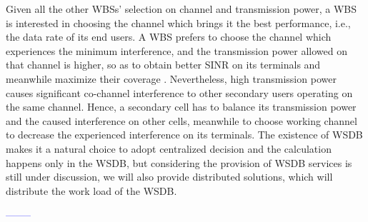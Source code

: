 \documentclass[times]{ettauth}
\newcommand{\ie}{i.e., }
\theoremstyle{mytheoremstyle}
\theoremstyle{mytheoremstyle}
\theoremstyle{mytheoremstyle}
\begin{document}
Given all the other WBSs' selection on channel and transmission power, a WBS is interested in choosing the channel which brings it the best performance, \ie the data rate of its end users.
A WBS prefers to choose the channel which experiences the minimum interference, and the transmission power allowed on that channel is higher, so as to obtain better SINR on its terminals and meanwhile maximize their coverage \cite{wuinfocom09, HoangPowerChannel2010}. 
Nevertheless, high transmission power causes significant co-channel interference to other secondary users operating on the same channel. 
Hence, a secondary cell has to balance its transmission power and the caused interference on other cells, meanwhile to choose working channel to decrease the experienced interference on its terminals. 
The existence of WSDB makes it a natural choice to adopt centralized decision and the calculation happens only in the WSDB, but considering the provision of WSDB services is still under discussion, we will also provide distributed solutions, which will distribute the work load of the WSDB.


\textcolor{blue}{--------}

%
\end{document}
